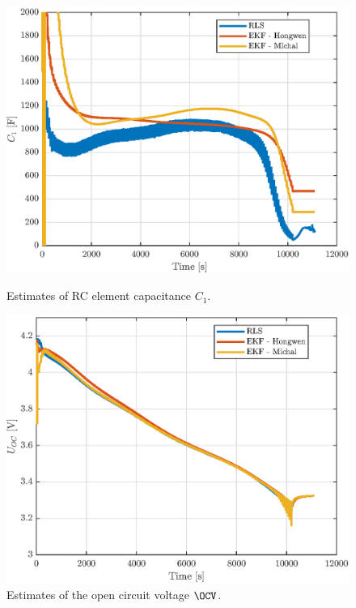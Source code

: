 \begin{figure}[t]
\centering
\begin{minipage}{0.49\textwidth}
    \centering
    \includegraphics[width=\textwidth]{figures/10/est-C.eps}
    \caption{Estimates of RC element capacitance $C_1$.}
    \label{fig:10-C1}
\end{minipage}
\hfill
\begin{minipage}{0.49\textwidth}
    \centering
    \includegraphics[width=\textwidth]{figures/10/est-OCV.eps}
    \caption{Estimates of the open circuit voltage $\OCV$.}
    \label{fig:10-OCV}
\end{minipage}
\end{figure}

